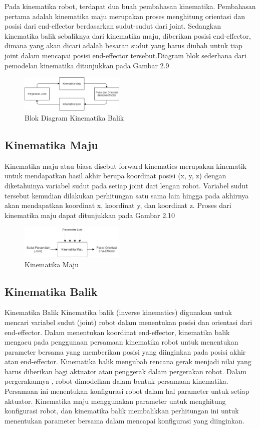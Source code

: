Pada kinematika robot, terdapat dua buah pembahasan kinematika. Pembahasan pertama adalah kinematika maju merupakan proses menghitung orientasi dan posisi dari end-effector berdasarkan sudut-sudut dari joint.  Sedangkan kinematika balik sebaliknya dari kinematika maju, diberikan posisi end-effector, dimana yang akan dicari adalah besaran sudut yang harus diubah untuk tiap joint dalam mencapai posisi end-effector tersebut.Diagram blok sederhana dari pemodelan kinematika ditunjukkan pada Gambar 2.9
	\begin{figure}[H]
	\centering
	\includegraphics[width=5cm]{gambar/kinematika_diagram.png}
	\caption{Blok Diagram Kinematika Balik}
\end{figure}

\subsection{Kinematika Maju}
Kinematika maju atau biasa disebut forward kinematics merupakan kinematik untuk mendapatkan hasil akhir berupa koordinat posisi (x, y, z) dengan diketahuinya variabel sudut pada setiap joint dari lengan robot.  Variabel sudut tersebut kemudian dilakukan perhitungan satu sama lain hingga pada akhirnya akan mendapatkan koordinat x, koordinat y, dan koordinat z. Proses dari kinematika maju dapat ditunjukkan pada Gambar 2.10
	\begin{figure}[H]
	\centering
	\includegraphics[width=5cm]{gambar/Kinematika_maju.png}
	\caption{Kinematika Maju}
\end{figure}


\subsection{Kinematika Balik}
Kinematika Balik Kinematika balik (inverse kinematics) digunakan untuk mencari variabel sudut (joint) robot dalam menentukan posisi dan orientasi dari end-effector. Dalam menentukan koordinat end-effector, kinematika balik mengacu pada penggunaan persamaan kinematika robot untuk menentukan parameter bersama yang memberikan posisi yang diinginkan pada posisi akhir atau end-effector. Kinematika balik mengubah rencana gerak menjadi nilai yang harus diberikan bagi aktuator atau penggerak dalam pergerakan robot.  Dalam pergerakannya , robot dimodelkan dalam bentuk persamaan kinematika. Persamaan ini menentukan konfigurasi robot dalam hal parameter untuk setiap aktuator. Kinematika maju menggunakan parameter untuk menghitung konfigurasi robot, dan kinematika balik membalikkan perhitungan ini untuk menentukan parameter bersama dalam mencapai konfigurasi yang diinginkan. 

